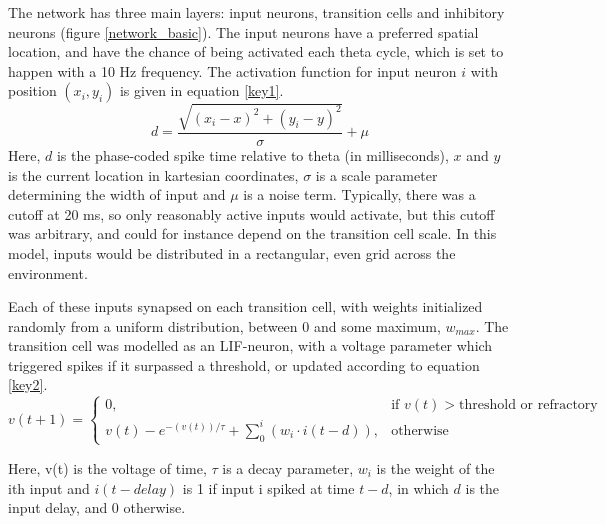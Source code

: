 \documentclass{article}
\begin{document}
    The network has three main layers: input neurons, transition cells and inhibitory neurons (figure \ref{network_basic}). The input neurons have a preferred spatial location, and have the chance of being activated each theta cycle, which is set to happen with a 10 Hz frequency. The activation function for input neuron \(i\) with position \((x_i, y_i)\) is given in equation \ref{key1}. \begin{equation} \label{key1} d = \frac{\sqrt{(x_i - x)^2 + (y_i - y)^2}}{\sigma} + \mu\end{equation}
    Here, \(d\) is the phase-coded spike time relative to theta (in milliseconds), \(x\) and \(y\) is the current location in kartesian coordinates, \(\sigma\) is a scale parameter determining the width of input and \(\mu\) is a noise term. Typically, there was a cutoff at 20 ms, so only reasonably active inputs would activate, but this cutoff was arbitrary, and could for instance depend on the transition cell scale. In this model, inputs would be distributed in a rectangular, even grid across the environment.
    
    Each of these inputs synapsed on each transition cell, with weights initialized randomly from a uniform distribution, between 0 and some maximum, \(w_{max}\). The transition cell was modelled as an LIF-neuron, with a voltage parameter which triggered spikes if it surpassed a threshold, or updated according to equation \ref{key2}.
    \begin{equation} \label{key2} v(t+1) =  \begin{cases} 0, & \text{if } v(t) > \text{threshold or refractory}\\ v(t) - e^{-(v(t)) / \tau} + \sum_{0}^{i} (w_{i} \cdot i(t-d)), & \text{otherwise} \end{cases} \end{equation}
    
    Here, v(t) is the voltage of time, \(\tau\) is a decay parameter, \(w_{i}\) is the weight of the ith input and \(i(t-delay)\) is 1 if input i spiked at time \(t-d\), in which \(d\) is the input delay, and 0 otherwise.
\end{document}
